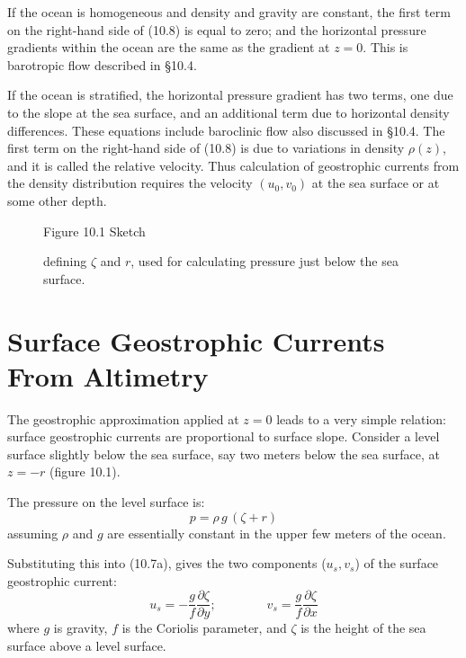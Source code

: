 If the ocean is homogeneous and density and gravity are constant, the first term
on the right-hand side of (10.8) is equal to zero; and the horizontal pressure
gradients within the ocean are the same as the gradient at $z = 0$. This is
barotropic flow described in \S10.4.

If the ocean is stratified, the horizontal pressure gradient has two terms,
one due to the slope at the sea surface, and an additional term due to
horizontal density differences. These equations include baroclinic flow also
discussed in \S10.4. The first term on the right-hand side of (10.8) is due to
variations in density $\rho (z)$, and it is called the relative velocity. Thus
calculation of geostrophic currents from the density distribution requires the
velocity
$\left(u_0, v_0\right)$ at the sea surface or at some other depth.

\begin{figure}[h!]
\centering
\footnotesize
Figure 10.1 Sketch \rule{0mm}{3ex}defining $\zeta$ and $r$, used for
calculating pressure just below the sea surface.

\label{fig:surfacesketch}
\vspace{-3ex}
\end{figure}

\section{Surface Geostrophic Currents From Altimetry}
The
geostrophic approximation applied at $z = 0$ leads to a very simple relation: surface
geostrophic currents are proportional to surface slope. Consider a level surface slightly
below the sea surface, say two meters below the sea surface, at
$z = -r$ (figure 10.1).

The pressure on the level surface is:
\begin{equation}
p = \rho\,g\,\left(\zeta + r\right)
\end{equation}
assuming $\rho$ and $g$ are essentially constant in the upper few meters of the
ocean.

Substituting this into (10.7a), gives the two components ($u_s, v_s$)
of the surface geostrophic current:
\begin{equation}
u_s =-\frac{g}{f}\frac{\partial\zeta}{\partial y}; \qquad \qquad
v_s =\frac{g}{f}\frac{\partial\zeta}{\partial x}
\end{equation}
where $g$ is gravity, $f$ is the Coriolis parameter, and $\zeta$ is
the height of the sea surface above a level surface.

